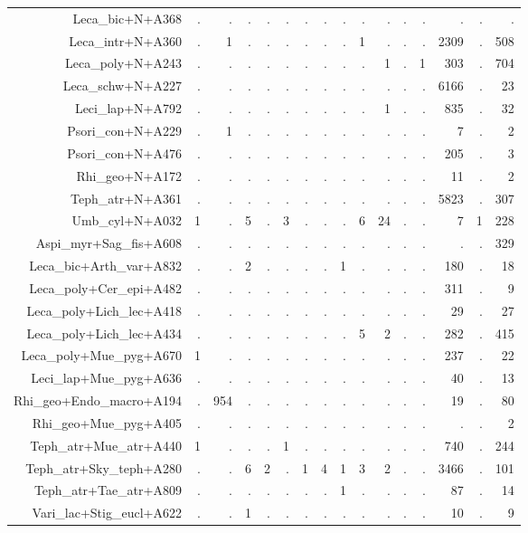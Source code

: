 \documentclass[a4paper, 11]{article}\usepackage[]{graphicx}\usepackage[]{color}
\begin{document}
\begin{table}
\begin{tabular}{rrrrrrrrrrrrrrrr}
  Leca\_bic+N+A368 & . & . & . & . & . & . & . & . & . & . & . & . & . & . & . \\ 
  Leca\_intr+N+A360 & . & 1 & . & . & . & . & . & . & 1 & . & . & . & 2309 & . & 508 \\ 
  Leca\_poly+N+A243 & . & . & . & . & . & . & . & . & . & 1 & . & 1 & 303 & . & 704 \\ 
  Leca\_schw+N+A227 & . & . & . & . & . & . & . & . & . & . & . & . & 6166 & . & 23 \\ 
  Leci\_lap+N+A792 & . & . & . & . & . & . & . & . & . & 1 & . & . & 835 & . & 32 \\ 
  Psori\_con+N+A229 & . & 1 & . & . & . & . & . & . & . & . & . & . & 7 & . & 2 \\ 
  Psori\_con+N+A476 & . & . & . & . & . & . & . & . & . & . & . & . & 205 & . & 3 \\ 
  Rhi\_geo+N+A172 & . & . & . & . & . & . & . & . & . & . & . & . & 11 & . & 2 \\ 
  Teph\_atr+N+A361 & . & . & . & . & . & . & . & . & . & . & . & . & 5823 & . & 307 \\ 
  Umb\_cyl+N+A032 & 1 & . & 5 & . & 3 & . & . & . & 6 & 24 & . & . & 7 & 1 & 228 \\ 
  Aspi\_myr+Sag\_fis+A608 & . & . & . & . & . & . & . & . & . & . & . & . & . & . & 329 \\ 
  Leca\_bic+Arth\_var+A832 & . & . & 2 & . & . & . & . & 1 & . & . & . & . & 180 & . & 18 \\ 
  Leca\_poly+Cer\_epi+A482 & . & . & . & . & . & . & . & . & . & . & . & . & 311 & . & 9 \\ 
  Leca\_poly+Lich\_lec+A418 & . & . & . & . & . & . & . & . & . & . & . & . & 29 & . & 27 \\ 
  Leca\_poly+Lich\_lec+A434 & . & . & . & . & . & . & . & . & 5 & 2 & . & . & 282 & . & 415 \\ 
  Leca\_poly+Mue\_pyg+A670 & 1 & . & . & . & . & . & . & . & . & . & . & . & 237 & . & 22 \\ 
  Leci\_lap+Mue\_pyg+A636 & . & . & . & . & . & . & . & . & . & . & . & . & 40 & . & 13 \\ 
  Rhi\_geo+Endo\_macro+A194 & . & 954 & . & . & . & . & . & . & . & . & . & . & 19 & . & 80 \\ 
  Rhi\_geo+Mue\_pyg+A405 & . & . & . & . & . & . & . & . & . & . & . & . & . & . & 2 \\ 
  Teph\_atr+Mue\_atr+A440 & 1 & . & . & . & 1 & . & . & . & . & . & . & . & 740 & . & 244 \\ 
  Teph\_atr+Sky\_teph+A280 & . & . & 6 & 2 & . & 1 & 4 & 1 & 3 & 2 & . & . & 3466 & . & 101 \\ 
  Teph\_atr+Tae\_atr+A809 & . & . & . & . & . & . & . & 1 & . & . & . & . & 87 & . & 14 \\ 
  Vari\_lac+Stig\_eucl+A622 & . & . & 1 & . & . & . & . & . & . & . & . & . & 10 & . & 9 \\ 
   \hline
\end{tabular}
\end{table}
\end{document}
